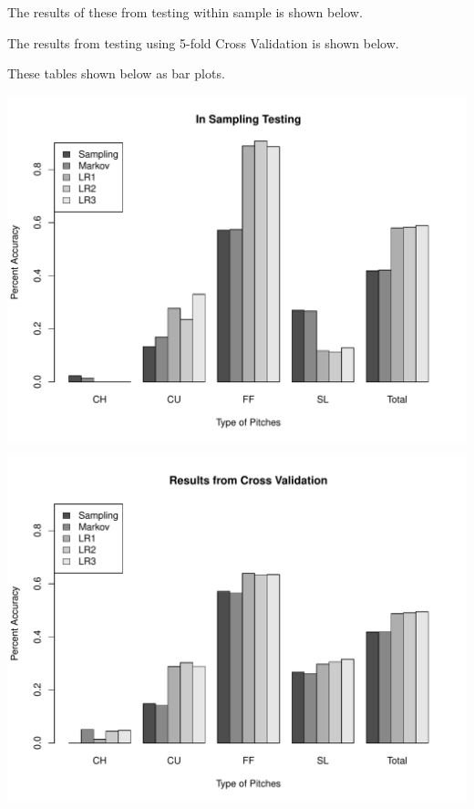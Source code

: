\documentclass{article}
\begin{document}
\noindent The results of these from testing within sample is shown below.



\noindent The results from testing using 5-fold Cross Validation is shown below.



\noindent These tables shown below as bar plots.

\begin{center}
		\includegraphics[scale = .7]{NOT_CV.pdf}
\end{center}

\begin{center}
		\includegraphics[scale = .7]{CV.pdf}
\end{center}
\end{document}
